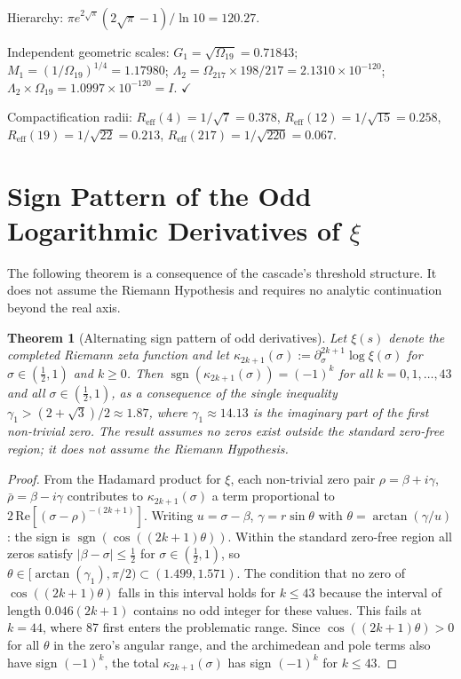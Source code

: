 \documentclass[11pt,a4paper]{article}
\newtheorem{theorem}{Theorem}[section]
\begin{document}
Hierarchy: $\pi e^{2\sqrt{\pi}}(2\sqrt{\pi}-1)/\ln 10 = 120.27$.

Independent geometric scales: $G_1 = \sqrt{\Omega_{19}} = 0.71843$; $M_1 = (1/\Omega_{19})^{1/4} = 1.17980$; $\Lambda_2 = \Omega_{217}\times 198/217 = 2.1310\times 10^{-120}$; $\Lambda_2\times\Omega_{19} = 1.0997\times 10^{-120} = I$. $\checkmark$

Compactification radii: $R_{\mathrm{eff}}(4) = 1/\sqrt{7} = 0.378$, $R_{\mathrm{eff}}(12) = 1/\sqrt{15} = 0.258$, $R_{\mathrm{eff}}(19) = 1/\sqrt{22} = 0.213$, $R_{\mathrm{eff}}(217) = 1/\sqrt{220} = 0.067$.

\section{Sign Pattern of the Odd Logarithmic Derivatives of $\xi$}

The following theorem is a consequence of the cascade's threshold structure. It does not assume the Riemann Hypothesis and requires no analytic continuation beyond the real axis.

\begin{theorem}[Alternating sign pattern of odd derivatives]
Let $\xi(s)$ denote the completed Riemann zeta function and let $\kappa_{2k+1}(\sigma) := \partial^{2k+1}_\sigma\log\xi(\sigma)$ for $\sigma\in(\frac{1}{2},1)$ and $k\geq 0$. Then $\operatorname{sgn}(\kappa_{2k+1}(\sigma)) = (-1)^k$ for all $k = 0, 1, \ldots, 43$ and all $\sigma\in(\frac{1}{2},1)$, as a consequence of the single inequality $\gamma_1 > (2+\sqrt{3})/2\approx 1.87$, where $\gamma_1\approx 14.13$ is the imaginary part of the first non-trivial zero. The result assumes no zeros exist outside the standard zero-free region; it does not assume the Riemann Hypothesis.
\end{theorem}

\begin{proof}
From the Hadamard product for $\xi$, each non-trivial zero pair $\rho = \beta+i\gamma$, $\bar{\rho} = \beta-i\gamma$ contributes to $\kappa_{2k+1}(\sigma)$ a term proportional to $2\,\mathrm{Re}[(\sigma-\rho)^{-(2k+1)}]$. Writing $u = \sigma-\beta$, $\gamma = r\sin\theta$ with $\theta = \arctan(\gamma/u)$: the sign is $\operatorname{sgn}(\cos((2k+1)\theta))$. Within the standard zero-free region all zeros satisfy $|\beta - \sigma| \leq \frac{1}{2}$ for $\sigma\in(\frac{1}{2},1)$, so $\theta\in[\arctan(\gamma_1),\pi/2)\subset(1.499, 1.571)$. The condition that no zero of $\cos((2k+1)\theta)$ falls in this interval holds for $k\leq 43$ because the interval of length $0.046(2k+1)$ contains no odd integer for these values. This fails at $k=44$, where 87 first enters the problematic range. Since $\cos((2k+1)\theta) > 0$ for all $\theta$ in the zero's angular range, and the archimedean and pole terms also have sign $(-1)^k$, the total $\kappa_{2k+1}(\sigma)$ has sign $(-1)^k$ for $k\leq 43$.
\end{proof}
\end{document}
